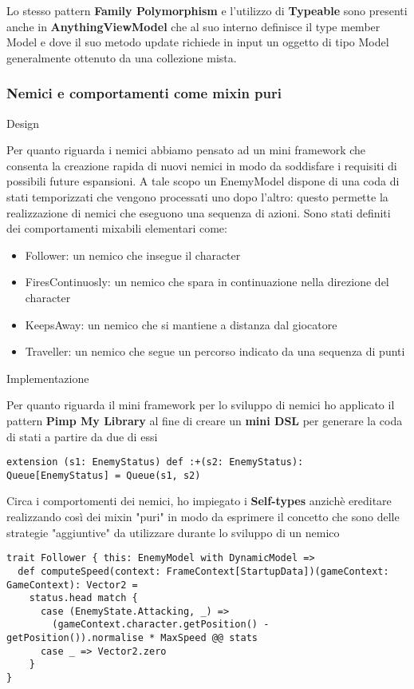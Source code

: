 Lo stesso pattern \textbf{Family Polymorphism} e l'utilizzo di \textbf{Typeable} sono presenti anche in \textbf{AnythingViewModel} che al suo interno definisce il type member Model e dove il suo metodo update richiede in input un oggetto di tipo Model generalmente ottenuto da una collezione mista.

\subsubsection{Nemici e comportamenti come mixin puri}
Design

Per quanto riguarda i nemici abbiamo pensato ad un mini framework che consenta la creazione rapida di nuovi nemici in modo da soddisfare i requisiti di possibili future espansioni.
A tale scopo un EnemyModel dispone di una coda di stati temporizzati che vengono processati uno dopo l'altro: questo permette la realizzazione di nemici che eseguono una sequenza di azioni.
Sono stati definiti dei comportamenti mixabili elementari come:
\begin{itemize}
    \item Follower: un nemico che insegue il character
    \item FiresContinuosly: un nemico che spara in continuazione nella direzione del character
    \item KeepsAway: un nemico che si mantiene a distanza dal giocatore
    \item Traveller: un nemico che segue un percorso indicato da una sequenza di punti
\end{itemize}

Implementazione

Per quanto riguarda il mini framework per lo sviluppo di nemici ho applicato il pattern \textbf{Pimp My Library} al fine di creare un \textbf{mini DSL} per generare la coda di stati a partire da due di essi 

\begin{lstlisting}[basicstyle=\tiny]
extension (s1: EnemyStatus) def :+(s2: EnemyStatus): Queue[EnemyStatus] = Queue(s1, s2)
\end{lstlisting} 

Circa i comportomenti dei nemici, ho impiegato i \textbf{Self-types} anzichè ereditare realizzando così dei mixin "puri" in modo da esprimere il concetto che sono delle strategie "aggiuntive" da utilizzare durante lo sviluppo di un nemico
\begin{lstlisting}[basicstyle=\tiny]
trait Follower { this: EnemyModel with DynamicModel =>
  def computeSpeed(context: FrameContext[StartupData])(gameContext: GameContext): Vector2 =
    status.head match {
      case (EnemyState.Attacking, _) =>
        (gameContext.character.getPosition() - getPosition()).normalise * MaxSpeed @@ stats
      case _ => Vector2.zero
    }
}
\end{lstlisting} 

